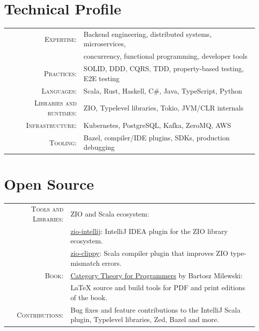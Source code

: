 \documentclass[a4paper,11pt]{article}
\begin{document}
\renewcommand{\arraystretch}{1.12}
\section{Technical Profile}
\begin{tabular}{rl}
  \textsc{Expertise:}& Backend engineering, distributed systems, microservices,\\
  &concurrency, functional programming, developer tools\\
  \textsc{Practices:}& SOLID, DDD, CQRS, TDD, property-based testing, E2E testing\\
  \textsc{Languages:}& Scala, Rust, Haskell, C\#, Java, TypeScript, Python\\
  \textsc{Libraries and runtimes:}& ZIO, Typelevel libraries, Tokio, JVM/CLR internals\\
  \textsc{Infrastructure:}& Kubernetes, PostgreSQL, Kafka, ZeroMQ, AWS\\
  \textsc{Tooling:}& Bazel, compiler/IDE plugins, SDKs, production debugging\\
\end{tabular}

\section{Open Source}
\begin{tabular}{r p{}}
  \textsc{Tools and Libraries:}& ZIO and Scala ecosystem:\\
  &\faGithub{} \href{https://github.com/zio/zio-intellij}{zio-intellij}: IntelliJ IDEA plugin for the ZIO library ecosystem.\\
  &\faGithub{} \href{https://github.com/hmemcpy/zio-clippy}{zio-clippy}: Scala compiler plugin that improves ZIO type-mismatch errors.\\[0.35em]
  \textsc{Book:}& \faGithub{} \href{https://github.com/hmemcpy/milewski-ctfp-pdf}{Category Theory for Programmers} by Bartosz Milewski:\\
  &\LaTeX{} source and build tools for PDF and print editions of the book.\\[0.35em]
  \textsc{Contributions:}& Bug fixes and feature contributions to the IntelliJ Scala plugin, Typelevel libraries, Zed, Bazel and more.
\end{tabular}
\end{document}
